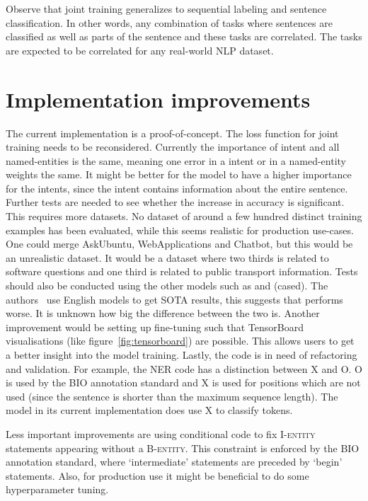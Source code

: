 Observe that joint training generalizes to sequential labeling and sentence classification.
In other words, any combination of tasks where sentences are classified as well as parts of the sentence and these tasks are correlated.
The tasks are expected to be correlated for any real-world NLP dataset.

\section{Implementation improvements}
\label{sec:implementation_improvements}
The current implementation is a proof-of-concept.
The loss function for joint training needs to be reconsidered.
Currently the importance of intent and all named-entities is the same, meaning one error in a intent or in a named-entity weights the same.
It might be better for the model to have a higher importance for the intents, since the intent contains information about the entire sentence.
Further tests are needed to see whether the increase in accuracy is significant.
This requires more datasets.
No dataset of around a few hundred distinct training examples has been evaluated, while this seems realistic for production use-cases.
One could merge AskUbuntu, WebApplications and Chatbot, but this would be an unrealistic dataset.
It would be a dataset where two thirds is related to software questions and one third is related to public transport information.
Tests should also be conducted using the other models such as  and  (cased).
The authors~\citep{devlin2018} use English models to get SOTA results, this suggests that  performs worse.
It is unknown how big the difference between the two is.
Another improvement would be setting up fine-tuning such that TensorBoard visualisations (like figure~\ref{fig:tensorboard}) are possible.
This allows users to get a better insight into the model training.
Lastly, the code is in need of refactoring and validation.
For example, the NER code has a distinction between X and O.
O is used by the BIO annotation standard and X is used for positions which are not used (since the sentence is shorter than the maximum sequence length).
The model in its current implementation does use X to classify tokens.

Less important improvements are using conditional code to fix I-\textsc{entity} statements appearing without a B-\textsc{entity}.
This constraint is enforced by the BIO annotation standard, where `intermediate' statements are preceded by `begin' statements.
Also, for production use it might be beneficial to do some hyperparameter tuning.

